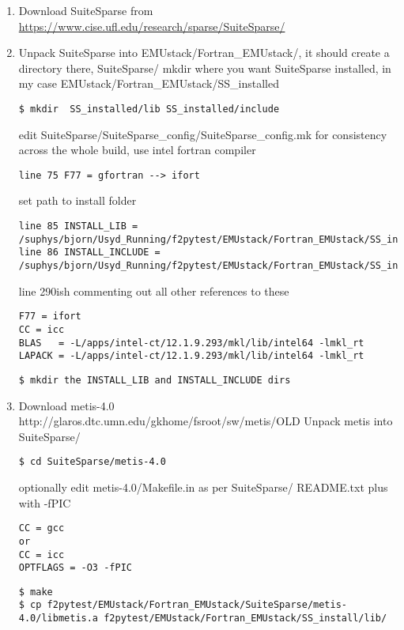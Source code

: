 \documentclass[11pt,a4paper,twoside]{report}
\begin{document}
\begin{enumerate}
\item Download SuiteSparse from \href{https://www.cise.ufl.edu/research/sparse/SuiteSparse/}{https://www.cise.ufl.edu/research/sparse/SuiteSparse/}


\item Unpack SuiteSparse into EMUstack/Fortran\_EMUstack/, it should create a directory there, SuiteSparse/
\lstset{language=bash}
mkdir where you want SuiteSparse installed, in my case EMUstack/Fortran\_EMUstack/SS\_installed
\begin{lstlisting}
$ mkdir  SS_installed/lib SS_installed/include
\end{lstlisting}

edit SuiteSparse/SuiteSparse\_config/SuiteSparse\_config.mk for consistency across the whole build, use intel fortran compiler
\begin{lstlisting}
line 75 F77 = gfortran --> ifort
\end{lstlisting}
set path to install folder
\begin{lstlisting}
line 85 INSTALL_LIB = /suphys/bjorn/Usyd_Running/f2pytest/EMUstack/Fortran_EMUstack/SS_install/lib
line 86 INSTALL_INCLUDE = /suphys/bjorn/Usyd_Running/f2pytest/EMUstack/Fortran_EMUstack/SS_install/include
\end{lstlisting}

line 290ish commenting out all other references to these
\begin{lstlisting}
F77 = ifort
CC = icc
BLAS   = -L/apps/intel-ct/12.1.9.293/mkl/lib/intel64 -lmkl_rt
LAPACK = -L/apps/intel-ct/12.1.9.293/mkl/lib/intel64 -lmkl_rt
\end{lstlisting}

\begin{lstlisting}
$ mkdir the INSTALL_LIB and INSTALL_INCLUDE dirs
\end{lstlisting}


\item Download metis-4.0 http://glaros.dtc.umn.edu/gkhome/fsroot/sw/metis/OLD
Unpack metis into SuiteSparse/
\begin{lstlisting}
$ cd SuiteSparse/metis-4.0
\end{lstlisting}
optionally edit metis-4.0/Makefile.in as per SuiteSparse/ README.txt plus with -fPIC
\begin{lstlisting}
CC = gcc
or 
CC = icc
OPTFLAGS = -O3 -fPIC
\end{lstlisting}
\begin{lstlisting}
$ make
$ cp f2pytest/EMUstack/Fortran_EMUstack/SuiteSparse/metis-4.0/libmetis.a f2pytest/EMUstack/Fortran_EMUstack/SS_install/lib/
\end{lstlisting}



\end{enumerate}
\end{document}
